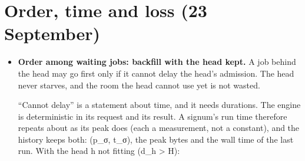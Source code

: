 \section{\texorpdfstring{Order, time and loss (23 September)}{Order, time and loss (23 September)}}

\begin{itemize}
\item \textbf{Order among waiting jobs: backfill with the head kept.} A job behind the head may go first only if it cannot delay the head's admission. The head never starves, and the room the head cannot use yet is not wasted.

“Cannot delay” is a statement about time, and it needs durations. The engine is deterministic in its request and its result. A signum's run time therefore repeats about as its peak does (each a measurement, not a constant), and the history keeps both: (p\_\allowbreak{}σ, t\_\allowbreak{}σ), the peak bytes and the wall time of the last run. With the head h not fitting (d\_\allowbreak{}h > H):


\end{itemize}
